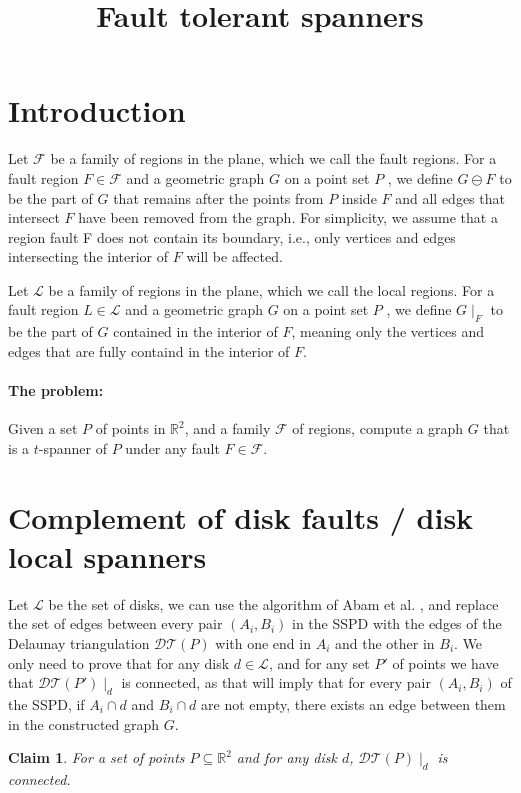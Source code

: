 \documentclass{article}
\title{Fault tolerant spanners}
\newtheorem{claim}[theorem]{Claim}
\newcommand{\R}{\mathbb{R}}
\newcommand{\FF}{\mathcal{F}}
\newcommand{\LL}{\mathcal{L}}
\newcommand{\DT}{\mathcal{DT}}
\begin{document}
	
	
	\maketitle
	
	\section{Introduction}
	
	Let $\FF$ be a family of regions in the plane, which we call the fault regions. For a fault region $F\in \FF$ and a geometric graph $G$ on a point set $P$ , we define $G\ominus F$ to be the part of $G$ that remains after the points from $P$ inside $F$ and all edges that intersect $F$ have been removed from the graph. For simplicity, we assume that a region fault F does not contain its boundary, i.e., only vertices and edges intersecting the interior of $F$ will be affected.
	
	Let $\LL$ be a family of regions in the plane, which we call the local regions. For a fault region $L\in \LL$ and a geometric graph $G$ on a point set $P$ , we define $G\mid_F$ to be the part of $G$ contained in the interior of $F$, meaning only the vertices and edges that are fully containd in the interior of $F$.
	
	\paragraph{The problem:} Given a set $P$ of points in $\R^2$, and a family $\FF$ of regions, compute a graph $G$ that is a $t$-spanner of $P$ under any fault $F\in\FF$.
	
	\section{Complement of disk faults / disk local spanners}
	
	Let $\LL$ be the set of disks, we can use the algorithm of Abam et al. \cite{bibid}, and replace the set of edges between every pair $(A_i,B_i)$ in the SSPD with the edges of the Delaunay triangulation $\DT(P)$ with one end in $A_i$ and the other in $B_i$. We only need to prove that for any disk $d\in \LL$, and for any set $P'$ of points we have that $\DT(P')\mid_d$ is connected, as that will imply that for every pair $(A_i,B_i)$ of the SSPD, if $A_i\cap d$ and $B_i\cap d$ are not empty, there exists an edge between them in the constructed graph $G$.
	
	\begin{claim}
		For a set of points $P\subseteq \R^2$ and for any disk $d$, $\DT(P)\mid_d$ is connected.
	\end{claim}
\end{document}
